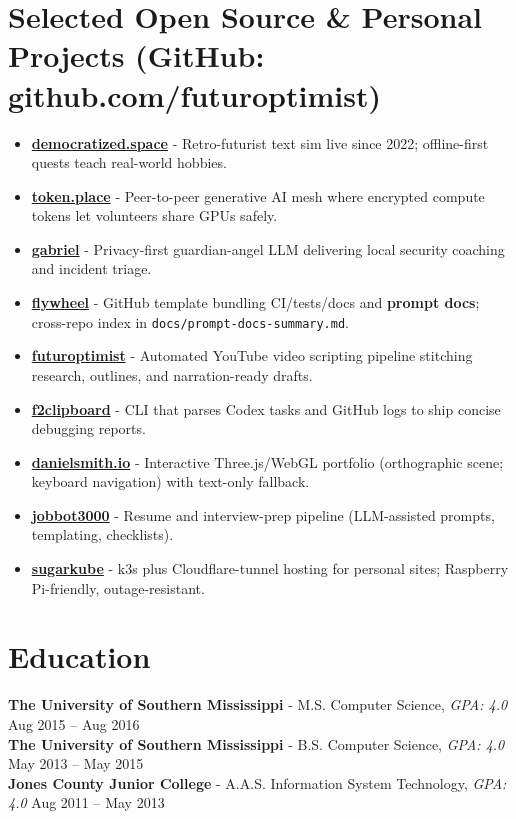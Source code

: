 \documentclass[10pt]{article}
\begin{document}
\vspace{-2mm}
\section*{Selected Open Source \& Personal Projects (GitHub: github.com/futuroptimist)}
\begin{itemize}
  \item \textbf{\href{https://democratized.space}{democratized.space}} - Retro-futurist text sim live
since 2022; offline-first quests teach real-world hobbies.
  \item \textbf{\href{https://token.place}{token.place}} - Peer-to-peer generative AI mesh where
encrypted compute tokens let volunteers share GPUs safely.
  \item \textbf{\href{https://github.com/futuroptimist/gabriel}{gabriel}} - Privacy-first guardian-angel
LLM delivering local security coaching and incident triage.
  \item \textbf{\href{https://github.com/futuroptimist/flywheel}{flywheel}} - GitHub template bundling
CI/tests/docs and \textbf{prompt docs}; cross-repo index in \texttt{docs/prompt-docs-summary.md}.
  \item \textbf{\href{https://github.com/futuroptimist/futuroptimist}{futuroptimist}} - Automated
YouTube video scripting pipeline stitching research, outlines, and narration-ready drafts.
  \item \textbf{\href{https://github.com/futuroptimist/f2clipboard}{f2clipboard}} - CLI that parses Codex
tasks and GitHub logs to ship concise debugging reports.
  \item \textbf{\href{https://github.com/futuroptimist/danielsmith.io}{danielsmith.io}} - Interactive
Three.js/WebGL portfolio (orthographic scene; keyboard navigation) with text-only fallback.
  \item \textbf{\href{https://github.com/futuroptimist/jobbot3000}{jobbot3000}} - Resume and interview-prep
pipeline (LLM-assisted prompts, templating, checklists).
  \item \textbf{\href{https://github.com/futuroptimist/sugarkube}{sugarkube}} - k3s plus Cloudflare-tunnel
hosting for personal sites; Raspberry Pi-friendly, outage-resistant.
\end{itemize}

\vspace{-2mm}
\section*{Education}
\textbf{The University of Southern Mississippi} - M.S. Computer Science, \textit{GPA: 4.0} \hfill Aug 2015 -- Aug 2016 \\
\textbf{The University of Southern Mississippi} - B.S. Computer Science, \textit{GPA: 4.0} \hfill May 2013 -- May 2015 \\
\textbf{Jones County Junior College} - A.A.S. Information System Technology, \textit{GPA: 4.0} \hfill Aug 2011 -- May 2013
\end{document}
